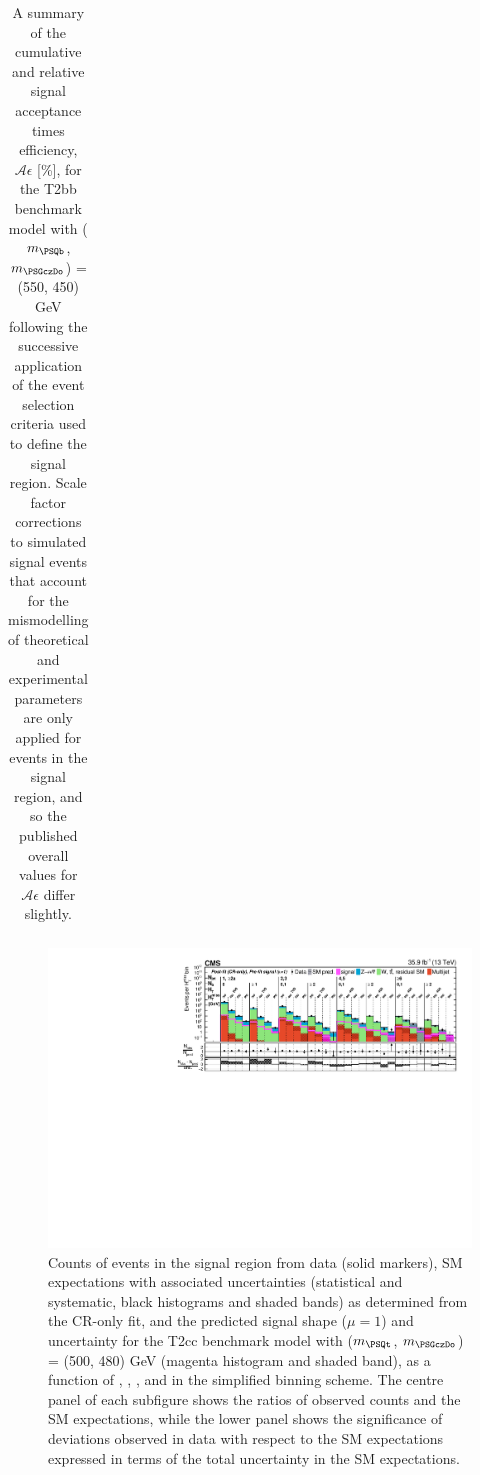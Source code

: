 \begin{table}[p]
\begin{center}
\begin{tabular}{lrr}
      \hline
        \end{tabular}
        \caption{A summary of the cumulative and relative signal acceptance times
        efficiency, $\mathcal{A}\epsilon$ [\%], for the
        T2bb benchmark model with ($m_{\PSQb}$, $m_{\PSGczDo}$) = (550, 450) GeV
        following the successive application of
        the event selection criteria used to define the signal region.  Scale
        factor corrections to simulated signal events that account for the
        mismodelling of theoretical and experimental parameters are only
        applied for events in the signal region, and so the published overall
        values for $\mathcal{A}\epsilon$ differ slightly.
}
        \label{tab:T2bb_550_450_MR_sig}
    \end{center}
\end{table}

\begin{figure}[p]
    \begin{center}
        \includegraphics[width=1.00\textwidth]{Supplementary/CMS-SUS-16-038_Figure-aux_028.pdf}
  \caption{Counts of events in the signal region from data (solid markers), SM expectations
    with associated uncertainties (statistical and systematic, black
    histograms and shaded bands) as determined from the CR-only fit,
    and the predicted signal shape ($\mu=1$) and uncertainty for the
        T2cc benchmark model with ($m_{\PSQt}$, $m_{\PSGczDo}$) = (500, 480) GeV
        (magenta histogram and shaded band),
    as a function of \njet, \nb, \scalht, and \mht in the simplified binning scheme.
    The centre panel of each subfigure shows the ratios of
    observed counts and the SM expectations, while the lower panel
    shows the significance of deviations observed in data with respect
    to the SM expectations expressed in terms of the total uncertainty
    in the SM expectations.  }
        \label{fig:T2cc_500_480_MR_sig}
    \end{center}
\end{figure}

